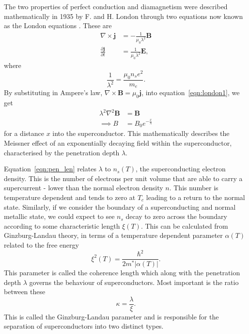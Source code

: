 \documentclass{article}
\numberwithin{equation}{section}
\begin{document}
The two properties of perfect conduction and diamagnetism were described mathematically in 1935 by F. and H. London through two equations now known as the London equations \cite{Poole2014Superconductivity}. These are
\begin{subequations}
\begin{align}
    \nabla \times \mathbf{j} &= -\frac{1}{\mu_0\lambda^2}\mathbf{B} \label{eqn:london1} \\
    \frac{\partial\mathbf{j}}{\partial t} &= \frac{1}{\mu_0\lambda^2}\mathbf{E} \label{eqn:london2},
\end{align}
\end{subequations}
where
\begin{equation}
    \frac{1}{\lambda^2} = \frac{\mu_0n_se^2}{m_e}. \label{eqn:pen_len}
\end{equation}
By substituting in Ampere's law, $\nabla \times \mathbf{B} = \mu_0 \mathbf{j}$, into equation~\ref{eqn:london1}, we get
\begin{align}
    \lambda^2\nabla^2\mathbf{B} &= \mathbf{B}\\
    \implies B &= B_0e^{-\frac{x}{\lambda}}
\end{align}
for a distance $x$ into the superconductor. This mathematically describes the Meissner effect of an exponentially decaying field within the superconductor, characterised by the penetration depth $\lambda$.

Equation~\ref{eqn:pen_len} relates $\lambda$ to $n_s(T)$, the superconducting electron density. This is the number of electrons per unit volume that are able to carry a supercurrent - lower than the normal electron density $n$. This number is temperature dependent and tends to zero at $T_c$ leading to a return to the normal state. Similarly, if we consider the boundary of a superconducting and normal metallic state, we could expect to see $n_s$ decay to zero across the boundary according to some characteristic length $\xi(T)$. This can be calculated from Ginzburg-Landau theory, in terms of a temperature dependent parameter $\alpha(T)$ related to the free energy \cite{Tinkham2004IntroductionSuperconductivity}
\begin{equation}
    \xi^2(T) = \frac{\hbar^2}{2m^*|\alpha(T)|}.
\end{equation}
This parameter is called the coherence length which along with the penetration depth $\lambda$ governs the behaviour of superconductors. Most important is the ratio between these \cite{Tinkham2004IntroductionSuperconductivity}
\begin{equation}
    \kappa = \frac{\lambda}{\xi}.
\end{equation}
This is called the Ginzburg-Landau parameter and is responsible for the separation of superconductors into two distinct types.
\end{document}
